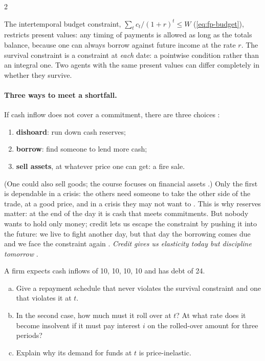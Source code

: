 \begin{paracol}{2}
\begin{intuition}
The intertemporal budget constraint, $\sum_t c_t/(1+r)^t \le W$ (\cref{eq:fp-budget}), restricts present values: any timing of payments
is allowed as long as the totals balance, because one can always borrow against future income at the rate $r$. The survival constraint is
a constraint at \emph{each} date: a pointwise condition rather than an integral one. Two agents with the same present values can
differ completely in whether they survive.
\end{intuition}

\paragraph{Three ways to meet a shortfall.} If cash inflow does not cover a commitment, there are three choices :
\begin{enumerate}
  \item \textbf{dishoard}: run down cash reserves;
  \item \textbf{borrow}: find someone to lend more cash;
  \item \textbf{sell assets}, at whatever price one can get: a fire sale.
\end{enumerate}
(One could also sell goods; the course focuses on financial assets .) Only the first is dependable in a crisis: the others
need someone to take the other side of the trade, at a good price, and in a crisis they may not want to . This is
why reserves matter: at the end of the day it is cash that meets commitments. But nobody wants to hold only money; credit lets us escape the
constraint by pushing it into the future: we live to fight another day, but that day the borrowing comes due and we face the constraint
again . \emph{Credit gives us elasticity today but discipline tomorrow} .

\begin{exercise}
A firm expects cash inflows of 10, 10, 10, 10 and has debt of 24.
\begin{enumerate}[(a)]
  \item Give a repayment schedule that never violates the survival constraint and one that violates it at $t$.
  \item In the second case, how much must it roll over at $t$? At what rate does it become insolvent if it must pay interest $i$ on the
        rolled-over amount for three periods?
  \item Explain why its demand for funds at $t$ is price-inelastic.
\end{enumerate}
\end{exercise}


\end{paracol}
